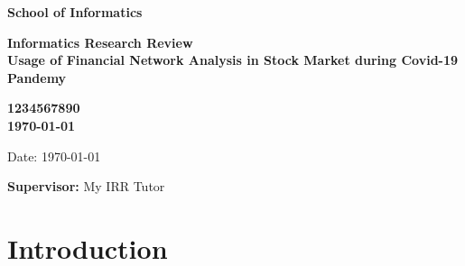 \documentclass[a4paper,11pt]{article}
\newcommand{\examnumber}{1234567890}
\newcommand{\field}{Usage of Financial Network Analysis in Stock Market during Covid-19 Pandemy}
\newcommand{\supervisor}{My IRR Tutor}
\begin{document}
\begin{minipage}[b]{110mm}
        {\Huge\bf School of Informatics
        \vspace*{17mm}}
\end{minipage}
\hfill
\begin{minipage}[t]{40mm}               
\end{minipage}
\par\noindent
\vspace*{2cm}
\begin{center}
        \Large\bf Informatics Research Review \\
        \Large\bf \field
\end{center}
\vspace*{1.5cm}
\begin{center}
        \bf \examnumber\\
        \monthyeardate\today
\end{center}
\vspace*{5mm}

%
%                       
\begin{abstract}
        When Covid-19 hits the world, it changed the landscape of stock market around the world.
        The pandemy exposed many systemic risks in global stock market, lethal enough to ripple and plummet stock prices across the globe.
        In this review, we examine the usage of Financial Network Analysis to model global crisis effect on global stock market and its application to prepare ourselves from similar disasters in the future.
\end{abstract}

\vspace*{1cm}

\vspace*{3cm}
Date: \today

\vfill
{\bf Supervisor:} \supervisor
\newpage

\setcounter{page}{1}                            %
\footruleheight{1pt}
\headruleheight{1pt}
\rhead{- \thepage}
\cfoot{}
%

\section{Introduction}
\end{document}
